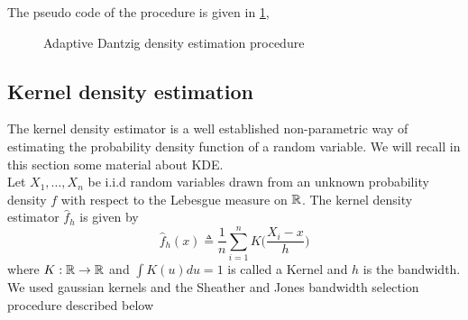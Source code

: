 The pseudo code of the procedure is given in \ref{algo:ad_algo}, 

\begin{figure}[h]
\begin{center}
   \caption{Adaptive Dantzig density estimation procedure}
   \label{algo:ad_algo}
\end{center}
\vspace{-15pt}
\end{figure}


\subsection{Kernel density estimation}

The kernel density estimator is a well established non-parametric way of estimating the probability density function of a random variable. We will recall in this section some material about KDE.\\
Let $X_1,\dots,X_n$ be i.i.d random variables drawn from an unknown probability density $f$ with respect to the Lebesgue measure on ${\mathbb R}$. The kernel density estimator $\hat f_h $ is given by
\begin{equation}
	\hat f_h(x) \triangleq \frac{1}{n}\sum_{i=1}^nK\Big(\frac{X_i-x}{h}\Big)
\end{equation}
where $K:{\mathbb R} \rightarrow {\mathbb R}$ and $\int K(u)du = 1$ is called a Kernel and $h$ is the bandwidth. We used gaussian kernels and the Sheather and Jones bandwidth selection procedure\cite{sheather_bdwth} described below



